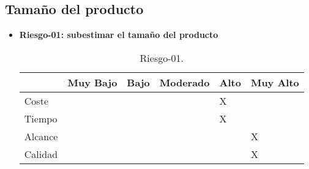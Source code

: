 \subsection{Tamaño del producto}
\begin{itemize}
	\item \textbf{Riesgo-01: subestimar el tamaño del producto}
	\begin{table}[h]
	\begin{center}
	\begin{tabular}{ l l l l l l }
	\hline
	& Muy Bajo & Bajo & Moderado & Alto & Muy Alto \\ \hline \hline
	Coste &  &  &  & X &  \\ \hline
	Tiempo &  &  &  & X &  \\ \hline
	Alcance &  &  &  &  & X \\ \hline
	Calidad &  &  &  &  & X \\ \hline
	\end{tabular}
	\caption{Riesgo-01.}
	\label{Riesgo-01}
	\end{center}
	\end{table}
\end{itemize}


